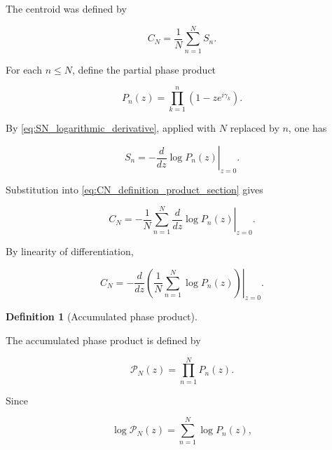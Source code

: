 \documentclass[11pt]{amsart}
\numberwithin{equation}{section}
\theoremstyle{plain}
\theoremstyle{definition}
\newtheorem{definition}[theorem]{Definition}
\theoremstyle{remark}
\begin{document}
The centroid was defined by

\begin{equation}
C_N
=
\frac{1}{N}
\sum_{n=1}^{N}
S_n.
\label{eq:CN_definition_product_section}
\end{equation}

For each \(n\le N\), define the partial phase product

\begin{equation}
P_n(z)
=
\prod_{k=1}^{n}
\left(1-z e^{i\gamma_k}\right).
\label{eq:partial_phase_product_definition}
\end{equation}

By \eqref{eq:SN_logarithmic_derivative}, applied with \(N\) replaced by
\(n\), one has

\begin{equation}
S_n
=
-
\left.
\frac{d}{dz}
\log P_n(z)
\right|_{z=0}.
\label{eq:Sn_partial_product_logarithmic_derivative}
\end{equation}

Substitution into \eqref{eq:CN_definition_product_section} gives

\begin{equation}
C_N
=
-
\frac{1}{N}
\sum_{n=1}^{N}
\left.
\frac{d}{dz}
\log P_n(z)
\right|_{z=0}.
\label{eq:CN_sum_logarithmic_derivatives}
\end{equation}

By linearity of differentiation,

\begin{equation}
C_N
=
-
\left.
\frac{d}{dz}
\left(
\frac{1}{N}
\sum_{n=1}^{N}
\log P_n(z)
\right)
\right|_{z=0}.
\label{eq:CN_average_logarithmic_derivative}
\end{equation}
\begin{definition}[Accumulated phase product]
\label{def:accumulated_phase_product}

The accumulated phase product is defined by

\begin{equation}
\mathcal{P}_N(z)
=
\prod_{n=1}^{N}
P_n(z).
\label{eq:accumulated_phase_product_definition}
\end{equation}

\end{definition}

Since

\begin{equation}
\log \mathcal{P}_N(z)
=
\sum_{n=1}^{N}
\log P_n(z),
\label{eq:accumulated_phase_product_logarithm}
\end{equation}
\end{document}
